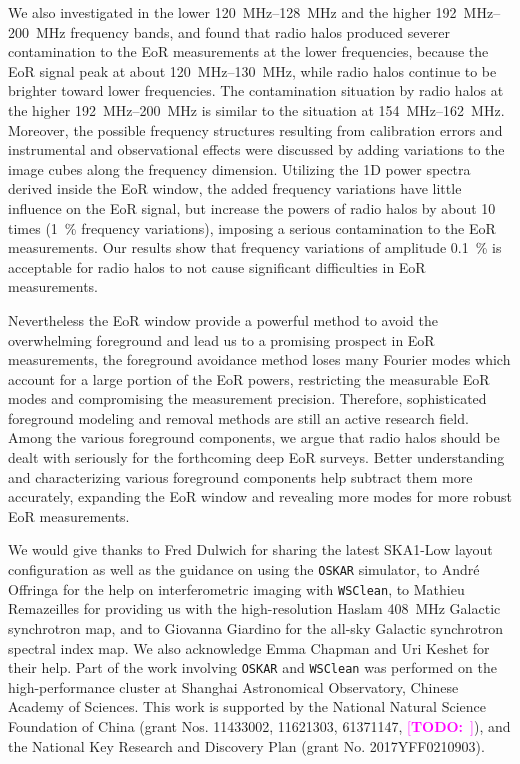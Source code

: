 \documentclass[modern]{aastex62}
\newcommand{\TODO}[1]{\textcolor{magenta}{[\textbf{TODO:}~\uuline{#1}]}}
\begin{document}
We also investigated in the lower \SIrange{120}{128}{\MHz} and the higher
\SIrange{192}{200}{\MHz} frequency bands, and found that radio halos
produced severer contamination to the EoR measurements at the lower
frequencies, because the EoR signal peak at about \SIrange{120}{130}{\MHz},
while radio halos continue to be brighter toward lower frequencies.
The contamination situation by radio halos at the higher
\SIrange{192}{200}{\MHz} is similar to the situation at
\SIrange{154}{162}{\MHz}.
Moreover, the possible frequency structures resulting from calibration
errors and instrumental and observational effects were discussed by
adding variations to the image cubes along the frequency dimension.
Utilizing the 1D power spectra derived inside the EoR window, the added
frequency variations have little influence on the EoR signal, but increase
the powers of radio halos by about 10 times (\SI{1}{\percent} frequency
variations), imposing a serious contamination to the EoR measurements.
Our results show that frequency variations of amplitude \SI{0.1}{\percent}
is acceptable for radio halos to not cause significant difficulties in
EoR measurements.

Nevertheless the EoR window provide a powerful method to avoid the
overwhelming foreground and lead us to a promising prospect in EoR
measurements, the foreground avoidance method loses many Fourier modes
which account for a large portion of the EoR powers, restricting the
measurable EoR modes and compromising the measurement precision.
Therefore, sophisticated foreground modeling and removal methods are
still an active research field.
Among the various foreground components, we argue that radio halos
should be dealt with seriously for the forthcoming deep EoR surveys.
Better understanding and characterizing various foreground components
help subtract them more accurately, expanding the EoR window and
revealing more modes for more robust EoR measurements.

\acknowledgments

We would give thanks
to Fred Dulwich for sharing the latest SKA1-Low layout configuration as well
as the guidance on using the \texttt{OSKAR} simulator,
to Andr\'e Offringa for the help on interferometric imaging with
\texttt{WSClean},
to Mathieu Remazeilles for providing us with the high-resolution Haslam
\SI{408}{\MHz} Galactic synchrotron map,
and to Giovanna Giardino for the all-sky Galactic synchrotron spectral index
map.
We also acknowledge Emma Chapman and Uri Keshet for their help.
Part of the work involving \texttt{OSKAR} and \texttt{WSClean} was performed
on the high-performance cluster at Shanghai Astronomical Observatory, Chinese
Academy of Sciences.
This work is supported by the National Natural Science Foundation of China
(grant Nos. 11433002, 11621303, 61371147, \TODO{???}),
and the National Key Research and Discovery Plan (grant No. 2017YFF0210903).
\end{document}
